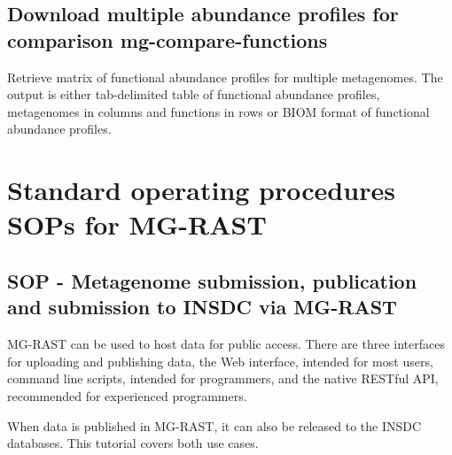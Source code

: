 \documentclass[letterpaper,10pt,english]{sphinxmanual}
\begin{document}
\section{Download multiple abundance profiles for comparison \textendash{} mg-compare-functions}
\label{\detokenize{api:download-multiple-abundance-profiles-for-comparison-mg-compare-functions}}
Retrieve matrix of functional abundance profiles for multiple
metagenomes. The output is either tab-delimited table of functional
abundance profiles, metagenomes in columns and functions in rows or BIOM
format of functional abundance profiles.


\begin{sphinxVerbatim}[commandchars=\\\{\}]
          
\end{sphinxVerbatim}


\chapter{Standard operating procedures SOPs for MG-RAST}
\label{\detokenize{api:standard-operating-procedures-sops-for-mg-rast}}

\section{SOP - Metagenome submission, publication and submission to INSDC via MG-RAST}
\label{\detokenize{api:sop-metagenome-submission-publication-and-submission-to-insdc-via-mg-rast}}
MG-RAST can be used to host data for public access. There are three
interfaces for uploading and publishing data, the Web interface,
intended for most users, command line scripts, intended for programmers,
and the native RESTful API, recommended for experienced programmers.

When data is published in MG-RAST, it can also be released to the INSDC
databases. This tutorial covers both use cases.
\end{document}
